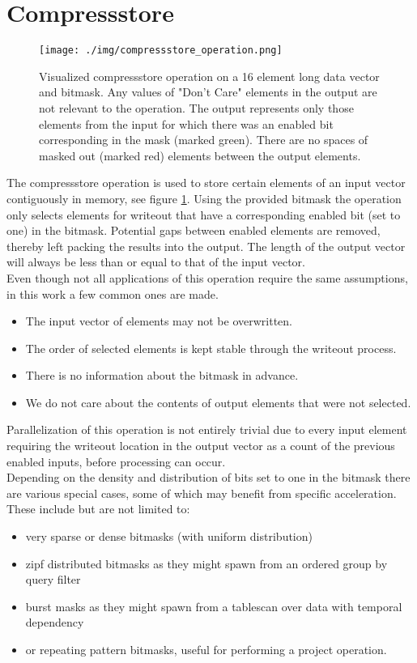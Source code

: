 \documentclass{tudscrreprt}
\begin{document}
		\section{Compressstore}
			\begin{figure}[!ht]
				\centering
				\texttt{[image: ./img/compressstore\_operation.png]}
				\caption{\label{fig:compressstore_operation}Visualized compressstore operation on a 16 element long data vector and bitmask. Any values of "Don't Care" elements in the output are not relevant to the operation. The output represents only those elements from the input for which there was an enabled bit corresponding in the mask (marked green). There are no spaces of masked out (marked red) elements between the output elements.}
			\end{figure}
			The compressstore operation is used to store certain elements of an input vector contiguously in memory, see figure \ref{fig:compressstore_operation}. Using the provided bitmask the operation only selects elements for writeout that have a corresponding enabled bit (set to one) in the bitmask. Potential gaps between enabled elements are removed, thereby left packing the results into the output. The length of the output vector will always be less than or equal to that of the input vector. \\
			Even though not all applications of this operation require the same assumptions, in this work a few common ones are made.
			\begin{itemize}
				\item The input vector of elements may not be overwritten.
				\item The order of selected elements is kept stable through the writeout process.
				\item There is no information about the bitmask in advance.
				\item We do not care about the contents of output elements that were not selected.
			\end{itemize}
			Parallelization of this operation is not entirely trivial due to every input element requiring the writeout location in the output vector as a count of the previous enabled inputs, before processing can occur. \\
			Depending on the density and distribution of bits set to one in the bitmask there are various special cases, some of which may benefit from specific acceleration. \\
			These include but are not limited to:
			\begin{itemize}
				\item very sparse or dense bitmasks (with uniform distribution)
				\item zipf distributed bitmasks as they might spawn from an ordered group by query filter
				\item burst masks as they might spawn from a tablescan over data with temporal dependency
				\item or repeating pattern bitmasks, useful for performing a project operation.
			\end{itemize}
\end{document}
